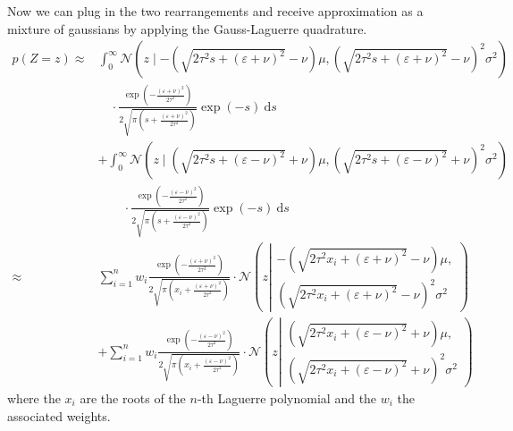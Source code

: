 \documentclass[11pt,a4paper]{book}
\begin{document}
Now we can plug in the two rearrangements and receive approximation as a mixture
of gaussians by applying the Gauss-Laguerre quadrature.
\begin{align*}
  p(Z = z) \approx& \int_{0}^{\infty} \mathcal{N}\left( z \mid -\left( \sqrt{2\tau^{2}s + (\varepsilon + \nu)^{2}} - \nu \right)\mu, \left( \sqrt{2\tau^{2}s + (\varepsilon + \nu)^{2}} - \nu \right)^{2}\sigma^{2} \right)\\
&\quad \cdot \frac{\exp\left( -\frac{(\varepsilon + \nu)^{2}}{2\tau^{2}} \right)}{2 \sqrt{\pi \left( s + \frac{(\varepsilon + \nu)^{2}}{2\tau^{2}} \right)}} \exp(-s)~\mathrm{d}s\\
                  & + \int_{0}^{\infty} \mathcal{N}\left( z \mid \left( \sqrt{2\tau^{2} s + (\varepsilon - \nu)^{2}} + \nu \right)\mu, \left( \sqrt{2\tau^{2} s + (\varepsilon - \nu)^{2}} + \nu \right)^{2}\sigma^{2} \right)\\
                  &\qquad \cdot \frac{\exp\left( -\frac{(\varepsilon - \nu)^{2}}{2\tau^{2}} \right)}{2\sqrt{\pi \left( s + \frac{(\varepsilon - \nu)^{2}}{2\tau^{2}} \right)}} \exp(-s)~\mathrm{d}s\\
  \approx& \sum_{i = 1}^{n} w_{i} \frac{\exp\left( -\frac{(\varepsilon + \nu)^{2}}{2\tau^{2}} \right)}{2 \sqrt{\pi \left( x_{i} + \frac{(\varepsilon + \nu)^{2}}{2\tau^{2}} \right)}} \cdot \mathcal{N}\left( z \left|
           \begin{array}{c}
             -\left( \sqrt{2\tau^{2}x_{i} + (\varepsilon + \nu)^{2}} - \nu \right)\mu,\\
             \left( \sqrt{2\tau^{2}x_{i} + (\varepsilon + \nu)^{2}} - \nu \right)^{2}\sigma^{2}
           \end{array} \right.\right)\\
                  &+ \sum_{i = 1}^{n} w_{i} \frac{\exp\left( -\frac{(\varepsilon - \nu)^{2}}{2\tau^{2}} \right)}{2\sqrt{\pi \left( x_{i} + \frac{(\varepsilon - \nu)^{2}}{2\tau^{2}} \right)}} \cdot \mathcal{N}\left( z \left|
                    \begin{array}{c}
                      \left( \sqrt{2\tau^{2} x_{i} + (\varepsilon - \nu)^{2}} + \nu \right)\mu,\\
                      \left( \sqrt{2\tau^{2} x_{i} + (\varepsilon - \nu)^{2}} + \nu \right)^{2}\sigma^{2}
                    \end{array} \right.\right)
\end{align*}
where the $x_{i}$ are the roots of the $n$-th Laguerre polynomial and the
$w_{i}$ the associated weights.
\end{document}
